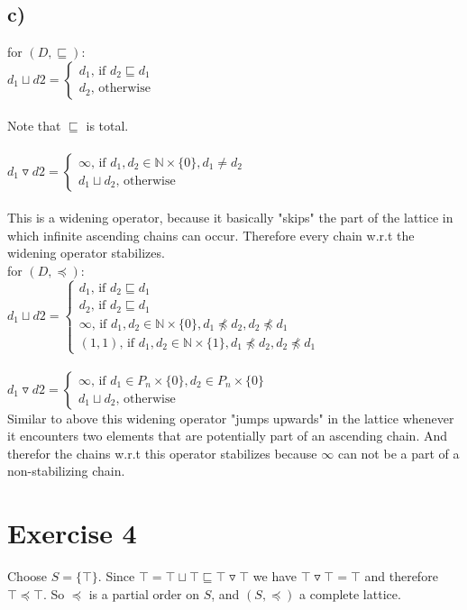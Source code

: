 \documentclass[fleqn,12pt]{article}
\begin{document}
\subsection*{c)}
for $(D,\sqsubseteq)$:\\
$d_1 \sqcup d2 =
\begin{cases}
d_1 \text{, if } d_2 \sqsubseteq d_1 \\
d_2 \text{, otherwise}
\end{cases}$\\\\
Note that $\sqsubseteq$ is total.\\\\
$d_1 \triangledown d2 =
\begin{cases}
\infty \text{, if } d_1,d_2 \in \mathbb{N} \times \{0\}, d_1 \neq d_2 \\
d_1 \sqcup d_2 \text{, otherwise}
\end{cases}$\\\\
This is a widening operator, because it basically "skips" the part of the lattice in which infinite ascending chains can occur.
Therefore every chain w.r.t the widening operator stabilizes.\\
for $(D,\preceq)$:\\
$d_1 \sqcup d2 =
\begin{cases}
d_1 \text{, if } d_2 \sqsubseteq d_1 \\
d_2 \text{, if } d_2 \sqsubseteq d_1 \\
\infty \text{, if } d_1,d_2 \in \mathbb{N}\times \{0\}, d_1 \not\preceq d_2, d_2 \not\preceq d_1 \\
(1,1) \text{, if } d_1,d_2 \in \mathbb{N}\times \{1\}, d_1 \not\preceq d_2, d_2 \not\preceq d_1
\end{cases}$\\\\

$d_1 \triangledown d2 =
\begin{cases}
\infty \text{, if } d_1 \in P_n \times \{0\}, d_2 \in P_n \times \{0\} \\
d_1 \sqcup d_2 \text{, otherwise}
\end{cases}$\\
Similar to above this widening operator "jumps upwards" in the lattice whenever it encounters two elements that are potentially part of an ascending chain.
And therefor the chains w.r.t this operator stabilizes because $\infty$ can not be a part of a non-stabilizing chain.
\section*{Exercise 4}
Choose $S = \lbrace \top \rbrace$. Since $\top = \top \sqcup \top \sqsubseteq \top \triangledown \top$ we have $\top \triangledown \top = \top$ and therefore $\top \preceq \top$.
So $\preceq$ is a partial order on $S$, and $(S,\preceq)$ a complete lattice.
\end{document}
